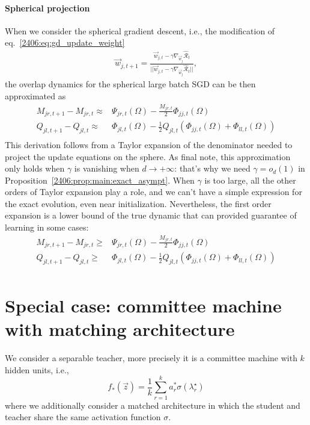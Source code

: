 \paragraph{Spherical projection} When we consider the spherical gradient descent, i.e., the modification of eq.~\eqref{2406:eq:gd_update_weight} 
\begin{align*}
    \vec w_{j,t + 1} = \frac{
    \vec w_{j,t } - \gamma  \nabla_{\vec w_j} \hat{\mathcal{R}}_t}
    {|| \vec w_{j,t } - \gamma  \nabla_{\vec w_j}\hat{\mathcal{R}}_t||},
\end{align*}
the overlap dynamics for the spherical large batch SGD can be then approximated as 
\begin{equation*}
\begin{split}
    M_{jr,t+1} - M_{jr,t} \approx& \Psi_{jr,t}{(\Omega)} - \frac{M_{jr,t}}{2}\Phi_{jj,t}{(\Omega)} \\
    Q_{jl,t+1} - Q_{jl,t} \approx& \Phi_{jl,t}{(\Omega)} - \frac{1}{2}Q_{jl,t}\left(\Phi_{jj,t}{(\Omega)}+\Phi_{ll,t}{(\Omega)}\right) \\
\end{split}
\end{equation*}
This derivation follows from a Taylor expansion of the denominator needed to project the update equations on the sphere. As final note, this approximation only holds when \(\gamma\) is vanishing when \(d\to+\infty\): that's why we need \(\gamma = o_d(1)\) in Proposition~\ref{2406:prop:main:exact_asympt}. When \(\gamma\) is too large, all the other orders of Taylor expansion play a role, and we can't have a simple expression for the exact evolution, even near initialization. Nevertheless, the first order expansion is a lower bound of the true dynamic that can provided guarantee of learning in some cases:
\begin{equation}\label{2406:eq:app:generallowerbound}
\begin{split}
    M_{jr,t+1} - M_{jr,t} \ge& \Psi_{jr,t}{(\Omega)} - \frac{M_{jr,t}}{2}\Phi_{jj,t}{(\Omega)} \\
    Q_{jl,t+1} - Q_{jl,t} \ge& \Phi_{jl,t}{(\Omega)} - \frac{1}{2}Q_{jl,t}\left(\Phi_{jj,t}{(\Omega)}+\Phi_{ll,t}{(\Omega)}\right) \\
\end{split}
\end{equation}

\section[Committee machine with matching architecture]{Special case: committee machine with matching architecture} \label{2406:sec:app:matching_architectures}
We consider a separable teacher, more precisely it is a committee machine with $k$ hidden units, i.e., \[f_*(\vec z) = \frac{1}{k} \sum_{r=1}^k a^*_r \sigma(\lambda^\star_r)\] where we additionally consider a matched architecture in which the student and teacher share the same activation function $\sigma$.

